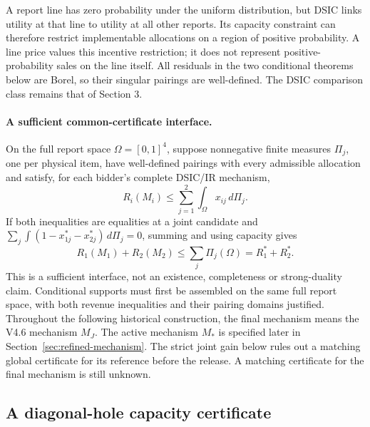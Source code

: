 A report line has zero probability under the uniform distribution, but DSIC
links utility at that line to utility at all other reports. Its capacity
constraint can therefore restrict implementable allocations on a region of
positive probability. A line price values this incentive restriction; it
does not represent positive-probability sales on the line itself. All residuals
in the two conditional theorems below are Borel, so their singular pairings are
well-defined. The DSIC comparison class remains that of Section 3.

\paragraph{A sufficient common-certificate interface.}
On the full report space $\Omega=[0,1]^4$, suppose nonnegative finite measures
$\Pi_j$, one per physical item, have well-defined pairings with every
admissible allocation and satisfy, for each bidder's complete DSIC/IR mechanism,
\[
 R_i(M_i)\le\sum_{j=1}^2\int_\Omega x_{ij}\,d\Pi_j.
\]
If both inequalities are equalities at a joint candidate and
$\sum_j\int(1-x_{1j}^*-x_{2j}^*)\,d\Pi_j=0$, summing and using capacity gives
\[
 R_1(M_1)+R_2(M_2)\le\sum_j\Pi_j(\Omega)=R_1^*+R_2^*.
\]
This is a sufficient interface, not an existence, completeness or strong-duality
claim. Conditional supports must first be assembled on the same full report
space, with both revenue inequalities and their pairing domains justified.
Throughout the following historical construction, the final mechanism means
the V4.6 mechanism $M_J$. The active mechanism $M_*$ is specified later
in Section~\ref{sec:refined-mechanism}.
The strict joint gain below rules out a matching global certificate for its
reference before the release. A matching certificate for the final mechanism
is still unknown.

\subsection{A diagonal-hole capacity certificate}\label{sec:diagonal-support}

